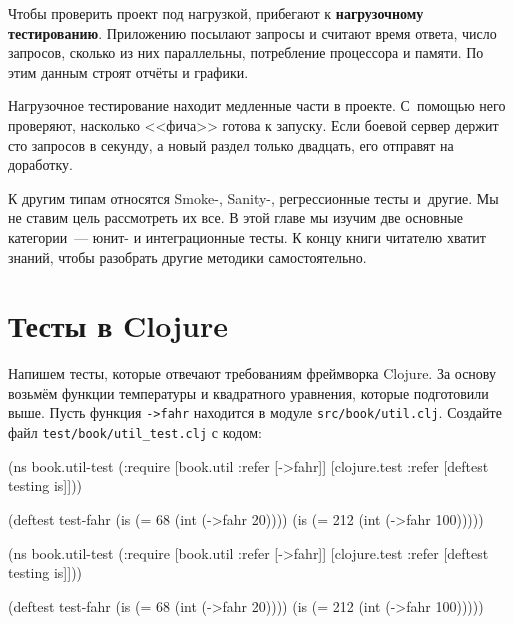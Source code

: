 Чтобы проверить проект под нагрузкой, прибегают к \textbf{нагрузочному тестированию}.
Приложению посылают запросы и считают время ответа, число запросов, сколько
из них параллельны, потребление процессора и памяти. По этим данным строят
отчёты и графики.


Нагрузочное тестирование находит медленные части в проекте. С~помощью него
проверяют, насколько <<фича>> готова к запуску. Если боевой сервер держит сто
запросов в секунду, а новый раздел только двадцать, его отправят на доработку.

К другим типам относятся Smoke-, Sanity-, регрессионные тесты и~другие. Мы не
ставим цель рассмотреть их все. В этой главе мы изучим две основные
категории~--- юнит- и интеграционные тесты. К концу книги читателю хватит
знаний, чтобы разобрать другие методики самостоятельно.

\section{Тесты в Clojure}

Напишем тесты, которые отвечают требованиям фреймворка Clojure. За основу
возьмём функции температуры и квадратного уравнения, которые подготовили
выше. Пусть функция \verb|->fahr| находится в модуле
\texttt{src/book/util\-.clj}. Создайте файл \verb|test/book/util_test.clj| с кодом:


\ifnarrow

\begin{english}
  \begin{clojure}
(ns book.util-test
  (:require
   [book.util :refer [->fahr]]
   [clojure.test :refer
    [deftest testing is]]))

(deftest test-fahr
  (is (= 68 (int (->fahr 20))))
  (is (= 212 (int (->fahr 100)))))
  \end{clojure}
\end{english}

\else

\begin{english}
  \begin{clojure}
(ns book.util-test
  (:require
    [book.util :refer [->fahr]]
    [clojure.test :refer [deftest testing is]]))

(deftest test-fahr
  (is (= 68 (int (->fahr 20))))
  (is (= 212 (int (->fahr 100)))))
  \end{clojure}
\end{english}

